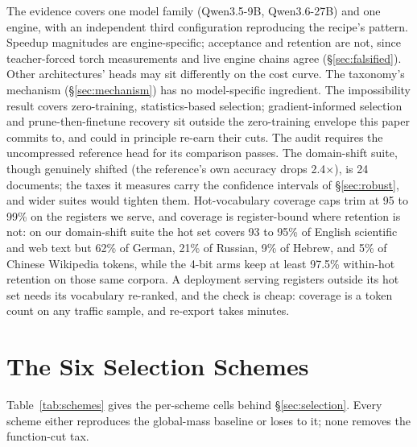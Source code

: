 \documentclass{article}
\newcommand{\x}{$\times$}
\begin{document}
The evidence covers one model family (Qwen3.5-9B, Qwen3.6-27B) and one engine, with an independent third configuration reproducing the recipe's pattern. Speedup magnitudes are engine-specific; acceptance and retention are not, since teacher-forced torch measurements and live engine chains agree (\S\ref{sec:falsified}). Other architectures' heads may sit differently on the cost curve. The taxonomy's mechanism (\S\ref{sec:mechanism}) has no model-specific ingredient. The impossibility result covers zero-training, statistics-based selection; gradient-informed selection and prune-then-finetune recovery sit outside the zero-training envelope this paper commits to, and could in principle re-earn their cuts. The audit requires the uncompressed reference head for its comparison passes. The domain-shift suite, though genuinely shifted (the reference's own accuracy drops 2.4\x), is 24 documents; the taxes it measures carry the confidence intervals of \S\ref{sec:robust}, and wider suites would tighten them. Hot-vocabulary coverage caps trim at 95 to 99\% on the registers we serve, and coverage is register-bound where retention is not: on our domain-shift suite the hot set covers 93 to 95\% of English scientific and web text but 62\% of German, 21\% of Russian, 9\% of Hebrew, and 5\% of Chinese Wikipedia tokens, while the 4-bit arms keep at least 97.5\% within-hot retention on those same corpora. A deployment serving registers outside its hot set needs its vocabulary re-ranked, and the check is cheap: coverage is a token count on any traffic sample, and re-export takes minutes.




\appendix

\section{The Six Selection Schemes}
\label{app:schemes}

Table~\ref{tab:schemes} gives the per-scheme cells behind \S\ref{sec:selection}. Every scheme either reproduces the global-mass baseline or loses to it; none removes the function-cut tax.
\end{document}
